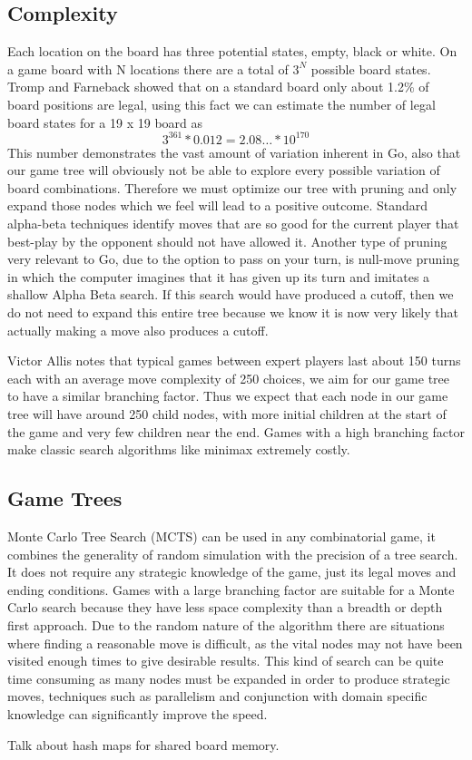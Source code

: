 \documentclass[conference]{IEEEtran}
\begin{document}
\subsection{Complexity}
Each location on the board has three potential states, empty, black or white. On a game board with N locations there are a total of $3^N$ possible board states. Tromp and Farneback showed that on a standard board only about 1.2\% of board positions are legal, using this fact we can estimate the number of legal board states for a 19 x 19 board as \[3^{361} * 0.012 = 2.08\dots * 10^{170}\]This number demonstrates the vast amount of variation inherent in Go, also that our game tree will obviously not be able to explore every possible variation of board combinations. Therefore we must optimize our tree with pruning and only expand those nodes which we feel will lead to a positive outcome. Standard alpha-beta techniques identify moves that are so good for the current player that best-play by the opponent should not have allowed it. Another type of pruning very relevant to Go, due to the option to pass on your turn, is null-move pruning in which the computer imagines that it has given up its turn and imitates a shallow Alpha Beta search. If this search would have produced a cutoff, then we do not need to expand this entire tree because we know it is now very likely that actually making a move also produces a cutoff.\par
Victor Allis notes that typical games between expert players last about 150 turns each with an average move complexity of 250 choices, we aim for our game tree to have a similar branching factor. Thus we expect that each node in our game tree will have around 250 child nodes, with more initial children at the start of the game and very few children near the end. Games with a high branching factor make classic search algorithms like minimax extremely costly.
\subsection{Game Trees}
Monte Carlo Tree Search (MCTS) can be used in any combinatorial game, it combines the generality of random simulation with the precision of a tree search. It does not require any strategic knowledge of the game, just its legal moves and ending conditions. Games with a large branching factor are suitable for a Monte Carlo search because they have less space complexity than a breadth or depth first approach. Due to the random nature of the algorithm there are situations where finding a reasonable move is difficult, as the vital nodes may not have been visited enough times to give desirable results. This kind of search can be quite time consuming as many nodes must be expanded in order to produce strategic moves, techniques such as parallelism and conjunction with domain specific knowledge can significantly improve the speed.\par
Talk about hash maps for shared board memory.
\end{document}
